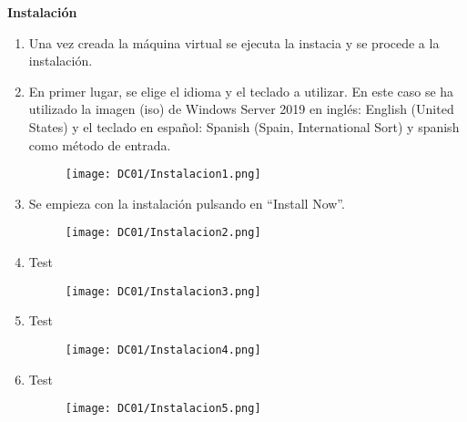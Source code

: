 \textbf{Instalación}

\begin{enumerate}
\item Una vez creada la máquina virtual se ejecuta la instacia y se procede a la instalación.
\item En primer lugar, se elige el idioma y el teclado a utilizar. En este caso se ha utilizado la imagen (iso) de Windows Server 2019 en inglés: English (United States) y el teclado en español: Spanish (Spain, International Sort) y spanish como método de entrada.

\begin{figure}[H] %
\begin{center}
\texttt{[image: DC01/Instalacion1.png]}
\end{center}
\end{figure}

\item Se empieza con la instalación pulsando en ``Install Now''.

\begin{figure}[H] %
\begin{center}
\texttt{[image: DC01/Instalacion2.png]}
\end{center}
\end{figure}


\item Test

\begin{figure}[H] %
\begin{center}
\texttt{[image: DC01/Instalacion3.png]}
\end{center}
\end{figure}

\item Test

\begin{figure}[H] %
\begin{center}
\texttt{[image: DC01/Instalacion4.png]}
\end{center}
\end{figure}

\item Test

\begin{figure}[H] %
\begin{center}
\texttt{[image: DC01/Instalacion5.png]}
\end{center}
\end{figure}


\end{enumerate}
